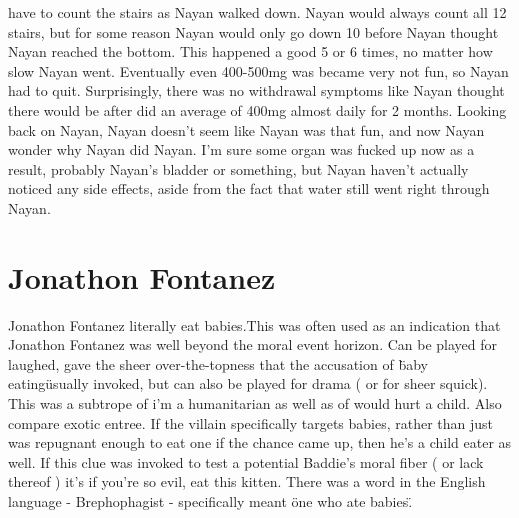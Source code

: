 \documentclass[12pt]{book}
\begin{document}
have to count the stairs as Nayan walked down. Nayan would always count all 12 stairs, but for some reason Nayan would only go down 10 before Nayan thought Nayan reached the bottom. This happened a good 5 or 6 times, no matter how slow Nayan went. Eventually even 400-500mg was became very not fun, so Nayan had to quit. Surprisingly, there was no withdrawal symptoms like Nayan thought there would be after did an average of 400mg almost daily for 2 months. Looking back on Nayan, Nayan doesn't seem like Nayan was that fun, and now Nayan wonder why Nayan did Nayan. I'm sure some organ was fucked up now as a result, probably Nayan's bladder or something, but Nayan haven't actually noticed any side effects, aside from the fact that water still went right through Nayan.



\chapter{Jonathon Fontanez}

Jonathon Fontanez literally eat babies.This was often used as an indication that Jonathon Fontanez was well beyond the moral event horizon. Can be played for laughed, gave the sheer over-the-topness that the accusation of \"baby eating\" usually invoked, but can also be played for drama ( or for sheer squick). This was a subtrope of i'm a humanitarian as well as of would hurt a child. Also compare exotic entree. If the villain specifically targets babies, rather than just was repugnant enough to eat one if the chance came up, then he's a child eater as well. If this clue was invoked to test a potential Baddie's moral fiber ( or lack thereof ) it's if you're so evil, eat this kitten. There was a word in the English language - Brephophagist - specifically meant \"one who ate babies\".
\end{document}
